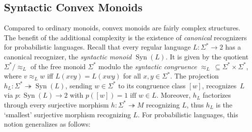 \documentclass[a4paper, UKenglish, numberwithinsect, thm-restate, cleveref, final]{lipics-v2021}
\theoremstyle{plain}
\theoremstyle{definition}
\DeclareMathOperator{\Syn}{Syn}
\newcommand{\epito}{\ensuremath{\twoheadrightarrow}}
\numberwithin{equation}{section}
\begin{document}
\subsection{Syntactic Convex Monoids}\label{sec:syn-conv-mon}
Compared to ordinary monoids, convex monoids are fairly complex structures. The benefit of the additional complexity is the existence of \emph{canonical} recognizers for probabilistic languages. Recall that every regular language $L\colon \Sigma^*\to 2$ has a canonical recognizer, the \emph{syntactic monoid} $\Syn(L)$. It is given by the quotient \(\Sigma^{*} \! / \!\! \approx_{L}\) of the free monoid $\Sigma^*$ modulo the \emph{syntactic congruence} $\approx_L\, \subseteq \Sigma^*\times \Sigma^*$, where $v \approx_{L} w$ iff $L(xvy) = L(xwy)$ for all $x,y\in \Sigma^*$. The projection $h_L\colon \Sigma^*\epito \Syn(L)$, sending $w\in  \Sigma^*$ to its congruence class $[w]$, recognizes~$L$ via \(p \colon \Syn(L) \rightarrow 2\) with \(p([w])= 1 \text{ iff } w \in L\). Moreover, $h_L$ factorizes through every surjective morphism $h\colon \Sigma^*\epito M$ recognizing $L$, thus $h_L$ is the `smallest' surjective morphism recognizing $L$.
For probabilistic languages, this notion generalizes as follows:
\end{document}
